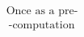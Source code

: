 \documentclass[preview]{standalone}
\begin{document}
\begin{align*}
\text{Once as a pre-} \\\ \text{-computation}
\end{align*}
\end{document}

